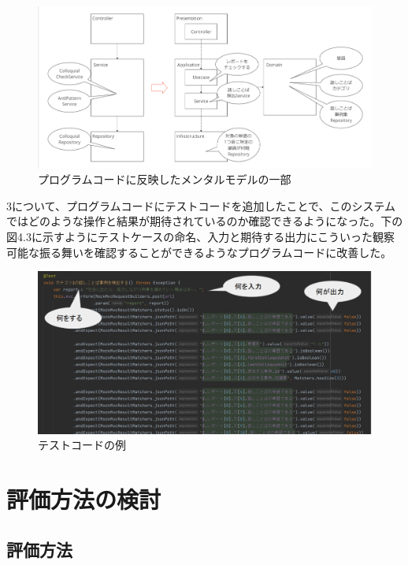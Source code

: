 \documentclass[12pt, a4paper]{jreport}
\begin{document}
\begin{figure}[H]
\centering
\includegraphics[width=1\linewidth]{image/kaizen1.png}
\caption{プログラムコードに反映したメンタルモデルの一部}
\label{fig:enter-label}
\end{figure}
3について、プログラムコードにテストコードを追加したことで、このシステムではどのような操作と結果が期待されているのか確認できるようになった。下の図4.3に示すようにテストケースの命名、入力と期待する出力にこういった観察可能な振る舞いを確認することができるようなプログラムコードに改善した。
\begin{figure}[H]
\centering
\includegraphics[width=1\linewidth]{image/kaizen3.png}
\caption{テストコードの例}
\label{fig:enter-label}
\end{figure}
\chapter{評価方法の検討}
\section{評価方法}
\end{document}
